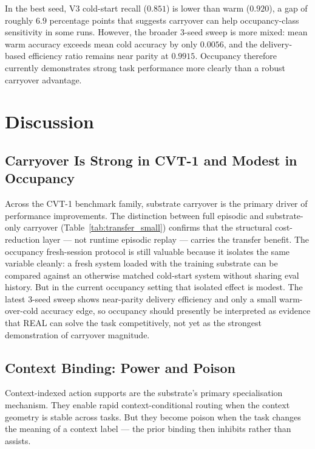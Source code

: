 \documentclass[10pt,twocolumn]{article}
\begin{document}
In the best seed, V3 cold-start recall ($0.851$) is lower than warm
($0.920$), a gap of roughly $6.9$ percentage points that suggests carryover
can help occupancy-class sensitivity in some runs.
However, the broader 3-seed sweep is more mixed: mean warm accuracy exceeds
mean cold accuracy by only $0.0056$, and the delivery-based efficiency ratio
remains near parity at $0.9915$.
Occupancy therefore currently demonstrates strong task performance more clearly
than a robust carryover advantage.

\section{Discussion}
\label{sec:discussion}

\subsection{Carryover Is Strong in CVT-1 and Modest in Occupancy}

Across the CVT-1 benchmark family, substrate carryover is the primary driver
of performance improvements.
The distinction between full episodic and substrate-only carryover
(Table~\ref{tab:transfer_small}) confirms that the structural cost-reduction
layer --- not runtime episodic replay --- carries the transfer benefit.
The occupancy fresh-session protocol is still valuable because it isolates the
same variable cleanly: a fresh system loaded with the training substrate can be
compared against an otherwise matched cold-start system without sharing eval
history.
But in the current occupancy setting that isolated effect is modest.
The latest 3-seed sweep shows near-parity delivery efficiency and only a small
warm-over-cold accuracy edge, so occupancy should presently be interpreted as
evidence that REAL can solve the task competitively, not yet as the strongest
demonstration of carryover magnitude.

\subsection{Context Binding: Power and Poison}

Context-indexed action supports are the substrate's primary specialisation
mechanism.
They enable rapid context-conditional routing when the context geometry is
stable across tasks.
But they become poison when the task changes the meaning of a context label ---
the prior binding then inhibits rather than assists.
\end{document}

